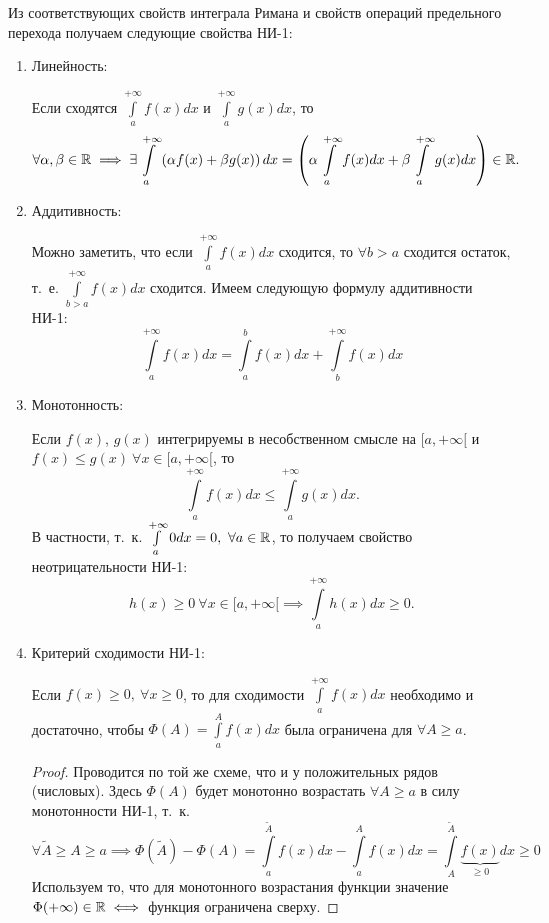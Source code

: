 \documentclass[../../main.tex]{subfiles}
\begin{document}
Из соответствующих свойств интеграла Римана и свойств операций предельного
перехода получаем следующие свойства НИ-1:
\begin{enumerate}
        \item Линейность:
        
        Если сходятся $\displaystyle\int\limits_a^{+\infty} f(x)dx$ и
        $\displaystyle\int\limits_a^{+\infty} g(x)dx$, то \[\forall \alpha, \beta \in \mathbb{R}
        \implies  \exists \int\limits_a^{+\infty} \left( \alpha f(x)
        + \beta g(x) \right)dx = \left( \alpha \int\limits_a^{+\infty}
        f(x)dx + \beta \int\limits_a^{+\infty} g(x)dx \right) \in \mathbb{R}.\]
        \item Аддитивность:
        
        Можно заметить, что если $\displaystyle\int\limits_a^{+\infty} f(x)dx$ сходится, то
        $\forall b>a$ сходится остаток, т.~е.
        $\displaystyle\int\limits_{b>a}^{+\infty} f(x)dx$ сходится. Имеем следующую формулу
        аддитивности НИ-1:
        \[\int\limits_a^{+\infty} f(x)dx = \int\limits_a^b f(x)dx +
        \int\limits_b^{+\infty} f(x)dx \]
        \item Монотонность:
        
        Если $f(x)$, $g(x)$ интегрируемы в несобственном смысле на
        $[a, +\infty[$
        и $f(x) \leq g(x) \ {\forall x \in [a, +\infty[}$, то
        \[\int\limits_a^{+\infty} f(x)dx \leq \int\limits_a^{+\infty} g(x)dx.\]
        В частности, т.~к. $\int\limits_a^{+\infty} 0dx = 0, \ \forall a \in \mathbb{R}$, то получаем свойство неотрицательности НИ-1: \[h(x) \geq 0 \ 
        \forall x \in
        [a, +\infty[ \implies \int\limits_a^{+\infty} h(x)dx \geq 0.\]
        \item Критерий сходимости НИ-1:
        
        Если $f(x) \geq 0, \ \forall x \geq 0$, то для сходимости
        $ \int\limits_a^{+\infty} f(x)dx$ необходимо и достаточно, чтобы $\Phi(A) =
        \int\limits_a^{A} f(x)dx$ была ограничена для $\forall A \geq a$.
        \begin{proof}
            Проводится по той же схеме, что и у положительных рядов (числовых).
            Здесь $\Phi(A)$ будет монотонно возрастать $\forall A \geq a$
            в силу монотонности НИ-1, т.~к.
            \[\forall \tilde{A} \geq A \geq a
            \implies \Phi(\tilde{A}) - \Phi(A) =
            \int\limits_a^{\tilde{A}} f(x)dx - \int\limits_a^{A} f(x)dx =
            \int\limits_A^{\tilde{A}} \underbrace{f(x)}_{\geq 0} dx \geq 0 \]
            Используем то, что для монотонного возрастания функции значение
            $\Phi (+\infty) \in \mathbb{R} \iff$ функция ограничена сверху.
        \end{proof}
\end{enumerate}
\end{document}
